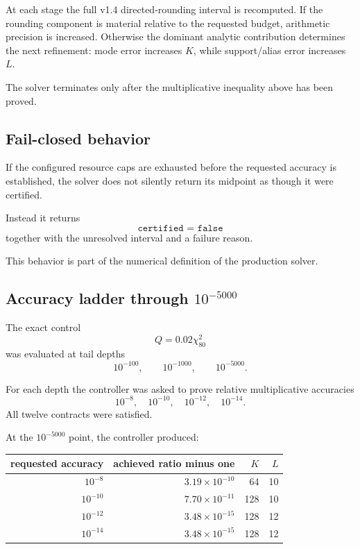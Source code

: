 \documentclass[11pt]{article}
\theoremstyle{definition}
\theoremstyle{remark}
\begin{document}
At each stage the full v1.4 directed-rounding interval is recomputed.  If the
rounding component is material relative to the requested budget, arithmetic
precision is increased.  Otherwise the dominant analytic contribution
determines the next refinement: mode error increases \(K\), while
support/alias error increases \(L\).

The solver terminates only after the multiplicative inequality above has been
proved.

\subsection{Fail-closed behavior}

If the configured resource caps are exhausted before the requested accuracy
is established, the solver does not silently return its midpoint as though it
were certified.

Instead it returns
\[
\boxed{\texttt{certified = false}}
\]
together with the unresolved interval and a failure reason.

This behavior is part of the numerical definition of the production solver.

\subsection{Accuracy ladder through \texorpdfstring{\(10^{-5000}\)}{1e-5000}}

The exact control
\[
Q=0.02\chi^2_{80}
\]
was evaluated at tail depths
\[
10^{-100},
\qquad
10^{-1000},
\qquad
10^{-5000}.
\]

For each depth the controller was asked to prove relative multiplicative
accuracies
\[
10^{-8},
\quad
10^{-10},
\quad
10^{-12},
\quad
10^{-14}.
\]
All twelve contracts were satisfied.

At the \(10^{-5000}\) point, the controller produced:

\begin{center}
\begin{tabular}{@{}rrrr@{}}
\toprule
requested accuracy & achieved ratio minus one & \(K\) & \(L\)\\
\midrule
\(10^{-8}\)  & \(3.19\times10^{-10}\) & 64  & 10\\
\(10^{-10}\) & \(7.70\times10^{-11}\) & 128 & 10\\
\(10^{-12}\) & \(3.48\times10^{-15}\) & 128 & 12\\
\(10^{-14}\) & \(3.48\times10^{-15}\) & 128 & 12\\
\bottomrule
\end{tabular}
\end{center}
\end{document}

